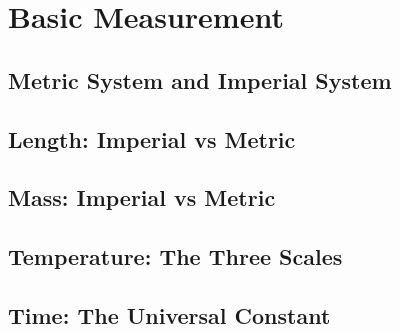 \documentclass[11pt]{article}
\begin{document}
\section{Basic Measurement}
\subsection{Metric System and Imperial System}
\subsection{Length: Imperial vs Metric}
\subsection{Mass: Imperial vs Metric}
\subsection{Temperature: The Three Scales}
\subsection{Time: The Universal Constant}
\end{document}
